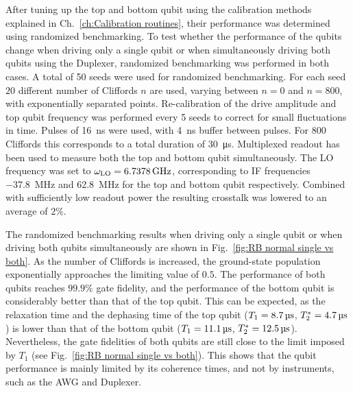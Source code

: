         After tuning up the top and bottom qubit using the calibration methods explained in Ch.~\ref{ch:Calibration routines}, their performance was determined using randomized benchmarking. To test whether the performance of the qubits change when driving only a single qubit or when simultaneously driving both qubits using the Duplexer, randomized benchmarking was performed in both cases. A total of 50 seeds were used for randomized benchmarking. For each seed $20$ different number of Cliffords $n$ are used, varying between $n=0$ and $n=800$, with exponentially separated points. Re-calibration of the drive amplitude and top qubit frequency was performed every 5 seeds to correct for small fluctuations in time. Pulses of \SI{16}{\nano \second} were used, with \SI{4}{\nano \second} buffer between pulses. For $800$ Cliffords this corresponds to a total duration of \SI{30}{\micro \second}. Multiplexed readout has been used to measure both the top and bottom qubit simultaneously. The LO frequency was set to $\omega_\text{LO}=\text{\ensuremath{\SI{6.7378}{\giga \hertz}}}$, corresponding to IF frequencies \SI{-37.8}{\mega \hertz} and \SI{62.8}{\mega \hertz} for the top and bottom qubit respectively. Combined with sufficiently low readout power the resulting crosstalk was lowered to an average of $2\%$.

        The randomized benchmarking results when driving only a single qubit or when driving both qubits simultaneously are shown in Fig.~\ref{fig:RB normal single vs both}. As the number of Cliffords is increased, the ground-state population exponentially approaches the limiting value of $0.5$. The performance of both qubits reaches $99.9\%$ gate fidelity, and the performance of the bottom qubit is considerably better than that of the top qubit.  This can be expected, as the relaxation time and the dephasing time of the top qubit ($T_1 = \text{\ensuremath{\SI{8.7}{\micro \second}}}$, $T_2^*=\text{\ensuremath{\SI{4.7}{\micro \second}}}$) is lower than that of the bottom qubit ($T_1 = \text{\ensuremath{\SI{11.1}{\micro \second}}}$, $T_2^*=\text{\ensuremath{\SI{12.5}{\micro \second}}}$). Nevertheless, the gate fidelities of both qubits are still close to the limit imposed by $T_1$ (see Fig.~\ref{fig:RB normal single vs both}). This shows that the qubit performance is mainly limited by its coherence times, and not by instruments, such as the AWG and Duplexer.

